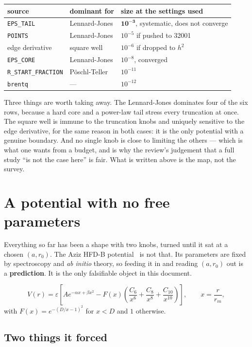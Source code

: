 \documentclass[11pt,a4paper]{article}
\begin{document}
\begin{center}
\begin{tabular}{lll}
\toprule
source & dominant for & size at the settings used \\
\midrule
\texttt{EPS\_TAIL} & Lennard-Jones & $\mathbf{10^{-3}}$, systematic, does not converge \\
\texttt{POINTS} & Lennard-Jones & $10^{-5}$ if pushed to 32001 \\
edge derivative & square well & $10^{-6}$ if dropped to $h^2$ \\
\texttt{EPS\_CORE} & Lennard-Jones & $10^{-8}$, converged \\
\texttt{R\_START\_FRACTION} & Pöschl-Teller & $10^{-11}$ \\
\texttt{brentq} & --- & $10^{-12}$ \\
\bottomrule
\end{tabular}
\end{center}

\noindent
Three things are worth taking away. The Lennard-Jones dominates four of the six
rows, because a hard core and a power-law tail stress every truncation at once.
The square well is immune to the truncation knobs and uniquely sensitive to the
edge derivative, for the same reason in both cases: it is the only potential
with a genuine boundary. And no single knob is close to limiting the others ---
which is what one wants from a budget, and is why the review's judgement that a
full study ``is not the case here'' is fair. What is written above is the map,
not the survey.

\section{A potential with no free parameters}
\label{sec:aziz}

Everything so far has been a shape with two knobs, turned until it sat at a
chosen $(a, r_0)$. The Aziz HFD-B potential~\cite{aziz} is not that. Its
parameters are fixed by spectroscopy and \emph{ab initio} theory, so feeding it
in and reading $(a, r_0)$ out is a \textbf{prediction}. It is the only
falsifiable object in this document.

\[
  V(r) = \varepsilon\left[A e^{-\alpha x + \beta x^2}
  - F(x)\left(\frac{C_6}{x^6}+\frac{C_8}{x^8}+\frac{C_{10}}{x^{10}}\right)\right],
  \qquad x = \frac{r}{r_m},
\]
with $F(x) = e^{-(D/x-1)^2}$ for $x<D$ and $1$ otherwise.

\subsection*{Two things it forced}
\end{document}
